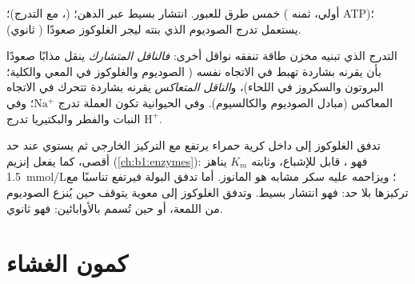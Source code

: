 \begin{omfigure}
{\small خمس طرق للعبور. انتشار بسيط عبر الدهن؛   (، مع التدرج)؛  ( أولي، ثمنه
ATP)؛  يستعمل تدرج الصوديوم الذي بنته  ليجر
الغلوكوز صعودًا ( ثانوي).}
\end{omfigure}

\begin{proposition}\label{prop:b1:membranes-transport:secondary}
التدرج الذي تبنيه  مخزن طاقة تنفقه نواقل أخرى: \emph{فالناقل
المتشارك} ينقل مذابًا صعودًا بأن يقرنه بشاردة
تهبط في الاتجاه نفسه ( الصوديوم والغلوكوز في المعي والكلية؛
 البروتون والسكروز في اللحاء)، و\emph{الناقل
المتعاكس} يقرنه بشاردة تتحرك في الاتجاه المعاكس
(مبادل الصوديوم والكالسيوم). وفي  الحيوانية تكون العملة تدرج
$\mathrm{Na^+}$؛ وفي النبات والفطر والبكتيريا تدرج $\mathrm{H^+}$.
\end{proposition}

\begin{example}\label{ex:b1:membranes-transport:kinetics}
تدفق الغلوكوز إلى داخل كرية حمراء يرتفع مع التركيز الخارجي ثم يستوي
عند حد أقصى، كما يفعل إنزيم (\cref{ch:b1:enzymes}): فهو ، قابل
للإشباع، وثابته $K_m$ يناهز \qty{1.5}{mmol/L}؛ ويزاحمه عليه سكر مشابه هو
المانوز. أما تدفق البولة فيرتفع تناسبًا مع تركيزها بلا حد: فهو انتشار
بسيط. وتدفق الغلوكوز إلى  معوية يتوقف حين يُنزع الصوديوم من
اللمعة، أو حين تُسمم  بالأوابائين: فهو  ثانوي.
\end{example}

\section{كمون الغشاء}

